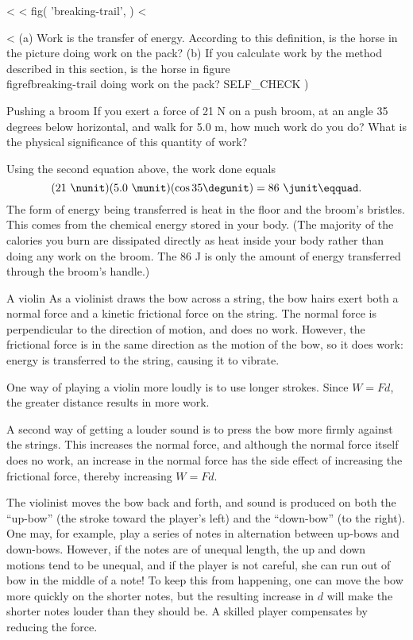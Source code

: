 <%
<%
  fig(
    'breaking-trail',
  )
<%

<%
(a) Work is the transfer of energy. According to this
definition, is the horse in the picture doing work on the
pack? (b) If you calculate work by the method described in
this section, is the horse in figure \\figref{breaking-trail} doing work on the pack?
  SELF_CHECK
  ) %

\begin{eg}{Pushing a broom}
\egquestion If you exert a force of 21 N on a push broom, at
an angle 35 degrees below horizontal, and walk for 5.0 m,
how much work do you do? What is the physical significance
of this quantity of work?

\eganswer Using the second equation above, the work done equals
\begin{equation*}
                (21\ \nunit)(5.0\ \munit)(\cos  35\degunit)  =  86\ \junit\eqquad.
\end{equation*}
The form of energy being transferred is heat in the floor
and the broom's bristles. This comes from the chemical
energy stored in your body. (The majority of the calories
you burn are dissipated directly as heat inside your body
rather than doing any work on the broom. The 86 J is only
the amount of energy transferred through the broom's handle.)
\end{eg}

\begin{eg}{A violin}
As a violinist draws the bow across a string, the bow hairs exert
both a normal force and a kinetic frictional force on the string. The normal
force is perpendicular to the direction of motion, and does no work.
However, the frictional force is in the same direction as the motion
of the bow, so it does work: energy is transferred to the string,
causing it to vibrate.

One way of playing a violin more loudly is to use longer
strokes. Since $W=Fd$, the greater distance results in more work.

A second way of getting a louder sound is to press the bow more
firmly against the strings. This increases the normal force, and
although the normal force itself does no work, an increase in the
normal force has the side effect of increasing the frictional force,
thereby increasing $W=Fd$.

The violinist moves the bow back and forth, and sound is produced on both
the ``up-bow'' (the stroke toward the player's left) and the ``down-bow''
(to the right). One may, for example, play a series of notes in alternation
between up-bows and down-bows. However, if the notes are of unequal length,
the up and down motions tend to be unequal, and if the player is not
careful, she can run out of bow in the middle of a note! To keep this
from happening, one can move the bow more quickly on the shorter notes,
but the resulting increase in $d$ will make the shorter notes louder than
they should be. A skilled player compensates by reducing the force.
\end{eg}

